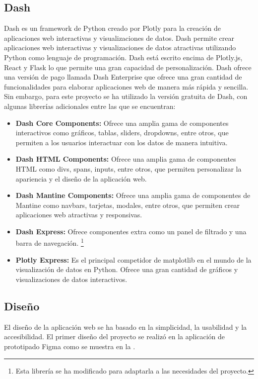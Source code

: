 \subsection{Dash}
Dash es un framework de Python creado por Plotly para la creación de aplicaciones web interactivas y visualizaciones de datos. Dash permite crear aplicaciones web interactivas y visualizaciones de datos atractivas utilizando Python como lenguaje de programación. Dash está escrito encima de Plotly.js, React y Flask lo que permite una gran capacidad de personalización.
Dash ofrece una versión de pago llamada Dash Enterprise que ofrece una gran cantidad de funcionalidades para elaborar aplicaciones web de manera más rápida y sencilla. Sin embargo, para este proyecto se ha utilizado la versión gratuita de Dash, con algunas librerías adicionales entre las que se encuentran:
\begin{itemize}
	\item \textbf{Dash Core Components:} Ofrece una amplia gama de componentes interactivos como gráficos, tablas, sliders, dropdowns, entre otros, que permiten a los usuarios interactuar con los datos de manera intuitiva.
	\item \textbf{Dash HTML Components:} Ofrece una amplia gama de componentes HTML como divs, spans, inputs, entre otros, que permiten personalizar la apariencia y el diseño de la aplicación web.
	\item \textbf{Dash Mantine Components:} Ofrece una amplia gama de componentes de Mantine como navbars, tarjetas, modales, entre otros, que permiten crear aplicaciones web atractivas y responsivas.
	\item \textbf{Dash Express:} Ofrece componentes extra como un panel de filtrado y una barra de navegación. \footnote{Esta librería se ha modificado para adaptarla a las necesidades del proyecto.}
	\item \textbf{Plotly Express:} Es el principal competidor de matplotlib en el mundo de la visualización de datos en Python. Ofrece una gran cantidad de gráficos y visualizaciones de datos interactivos.
\end{itemize}

\subsection{Diseño}
El diseño de la aplicación web se ha basado en la simplicidad, la usabilidad y la accesibilidad. El primer diseño del proyecto se realizó en la aplicación de prototipado Figma como se muestra en la .

